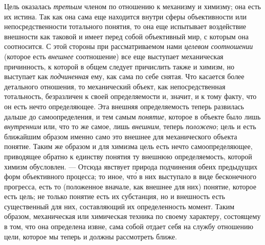 \documentclass[twoside]{article}
\begin{document}
{{{{Цель оказалась
{\em третьим} членом по
отношению к механизму и химизму; она есть их истина. Так как она сама еще
находится внутри сферы объективности или непосредственности тотального
понятия, то она еще испытывает воздействие внешности как таковой и имеет
перед собой объективный мир, с которым она соотносится. С этой стороны при
рассматриваемом нами {\em целевом
соотношении} (которое есть
{\em внешнее}
соотношение) все еще выступает механическая причинность, к
которой в общем следует причислить также и химизм, но выступает как
{\em подчиненная} ему,
как сама по себе снятая. Что касается более детального отношения, то
механический объект, как непосредственная тотальность, безразличен к своей
определяемости и, значит, и к тому факту, что он есть нечто определяющее.
Эта внешняя определяемость теперь развилась дальше до самоопределения, и
тем самым {\em понятие},
которое в объекте было лишь
{\em внутренним} или, что
то же самое, лишь {\em внешним},
теперь {\em положено};
цель и есть ближайшим образом именно само это внешнее для
механического объекта понятие. Таким же образом и для химизма цель есть
нечто самоопределяющее, приводящее обратно к единству понятия ту внешнюю
определяемость, которой химизм обусловлен. — Отсюда явствует
природа подчинения обеих предыдущих форм объективного процесса; то иное, что́
 в них выступало в виде бесконечного прогресса, есть то (положенное
вначале, как внешнее для них) понятие, которое есть цель; не только понятие
есть их субстанция, но и внешность есть существенный для них, составляющий
их определенность момент. Таким образом, механическая или
химическая техника по своему характеру, состоящему в том, что она
определена извне, сама собой отдает себя на службу отношению цели, которое
мы теперь и должны рассмотреть ближе.

}}}}
\end{document}
